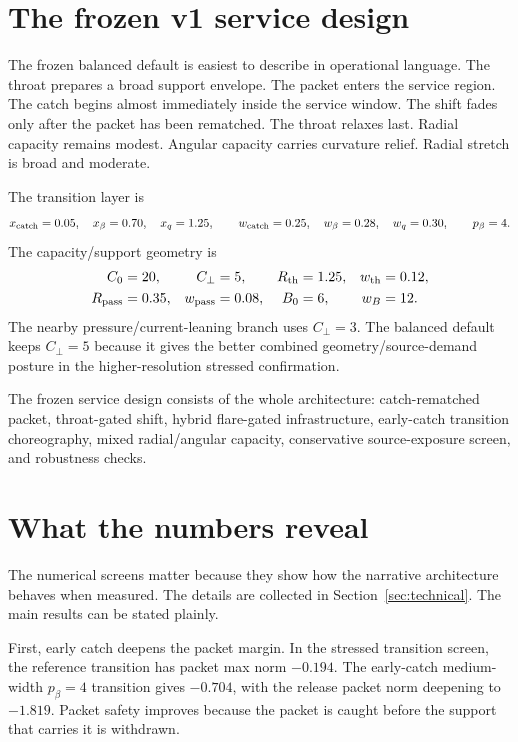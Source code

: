 \documentclass[11pt]{article}
\begin{document}
\section{The frozen v1 service design}

The frozen balanced default is easiest to describe in operational language. The throat prepares a broad support envelope. The packet enters the service region. The catch begins almost immediately inside the service window. The shift fades only after the packet has been rematched. The throat relaxes last. Radial capacity remains modest. Angular capacity carries curvature relief. Radial stretch is broad and moderate.

The transition layer is
\begin{equation}
 x_{\rm catch}=0.05,\quad x_\beta=0.70,\quad x_q=1.25,
 \qquad
 w_{\rm catch}=0.25,\quad w_\beta=0.28,\quad w_q=0.30,
 \qquad
 p_\beta=4.
\end{equation}
The capacity/support geometry is
\begin{equation}
\begin{aligned}
 C_0&=20, & C_\perp&=5, & R_{\rm th}&=1.25, & w_{\rm th}&=0.12,\\
 R_{\rm pass}&=0.35, & w_{\rm pass}&=0.08, & B_0&=6, & w_B&=12.
\end{aligned}
\end{equation}
The nearby pressure/current-leaning branch uses $C_\perp=3$. The balanced default keeps $C_\perp=5$ because it gives the better combined geometry/source-demand posture in the higher-resolution stressed confirmation.

The frozen service design consists of the whole architecture: catch-rematched packet, throat-gated shift, hybrid flare-gated infrastructure, early-catch transition choreography, mixed radial/angular capacity, conservative source-exposure screen, and robustness checks.

\section{What the numbers reveal}

The numerical screens matter because they show how the narrative architecture behaves when measured. The details are collected in Section~\ref{sec:technical}. The main results can be stated plainly.

First, early catch deepens the packet margin. In the stressed transition screen, the reference transition has packet max norm $-0.194$. The early-catch medium-width $p_\beta=4$ transition gives $-0.704$, with the release packet norm deepening to $-1.819$. Packet safety improves because the packet is caught before the support that carries it is withdrawn.
\end{document}
